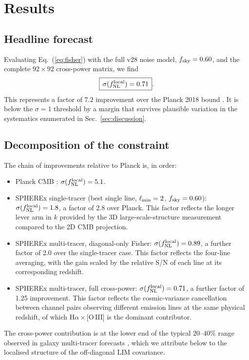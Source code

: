\documentclass[twocolumn,prd,nofootinbib,superscriptaddress,floatfix,11pt]{revtex4-2}
\begin{document}
\FloatBarrier

\section{Results}
\label{sec:results}

\subsection{Headline forecast}
\label{sec:results:headline}

Evaluating Eq.~(\ref{eq:fisher}) with the full v28 noise model, $f_{\rm sky}=0.60$, and the complete $92\times 92$ cross-power matrix, we find
\begin{equation}
\boxed{\,\sigma(f_{\rm NL}^{\rm local}) = 0.71\,}.
\label{eq:headline}
\end{equation}
This represents a factor of $7.2$ improvement over the Planck 2018 bound \citep{Planck2020PNG}.  It is below the $\sigma=1$ threshold by a margin that survives plausible variation in the systematics enumerated in Sec.~\ref{sec:discussion}.

\subsection{Decomposition of the constraint}
\label{sec:results:decomp}

The chain of improvements relative to Planck is, in order:
\begin{itemize}
\item Planck CMB \citep{Planck2020PNG}: $\sigma(f_{\rm NL}^{\rm local}) = 5.1$.
\item SPHEREx single-tracer (best single line, $\ell_{\rm min}=2$, $f_{\rm sky}=0.60$): $\sigma(f_{\rm NL}^{\rm local}) = 1.8$, a factor of $2.8$ over Planck.  This factor reflects the longer lever arm in $k$ provided by the 3D large-scale-structure measurement compared to the 2D CMB projection.
\item SPHEREx multi-tracer, diagonal-only Fisher: $\sigma(f_{\rm NL}^{\rm local}) = 0.89$, a further factor of 2.0 over the single-tracer case.  This factor reflects the four-line averaging, with the gain scaled by the relative S/N of each line at its corresponding redshift.
\item SPHEREx multi-tracer, full cross-power: $\sigma(f_{\rm NL}^{\rm local}) = 0.71$, a further factor of 1.25 improvement.  This factor reflects the cosmic-variance cancellation between channel pairs observing different emission lines at the same physical redshift, of which H$\alpha\times$[O\,III] is the dominant contributor.
\end{itemize}
The cross-power contribution is at the lower end of the typical $20$--$40\%$ range observed in galaxy multi-tracer forecasts \citep{Seljak2009}, which we attribute below to the localised structure of the off-diagonal LIM covariance.
\end{document}
